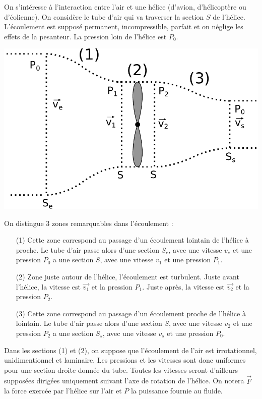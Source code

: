 \documentclass{report}
\begin{document}
On s'intéresse à l'interaction entre l'air et une hélice (d'avion, d'hélicoptère ou d'éolienne). On considère le tube d'air qui va traverser la section $S$ de l'hélice. L'écoulement est supposé permanent, incompressible, parfait et on néglige les effets de la pesanteur. La pression loin de l'hélice est $P_0$. 

\begin{center}
	\includegraphics[scale=0.5]{meca_flu6.pdf}
\end{center}

On distingue 3 zones remarquables dans l'écoulement :
\begin{itemize}
	\item[(1) ] Cette zone correspond au passage d'un écoulement lointain de l'hélice à proche. Le tube d'air passe alors d'une section $S_e$, avec une vitesse $v_e$ et une pression $P_0$ a une section $S$, avec une vitesse $v_1$ et une pression $P_1$.
	\item[(2) ] Zone juste autour de l'hélice, l'écoulement est turbulent. Juste avant l'hélice, la vitesse est $\vec{v_1}$ et la pression $P_1$. Juste après, la vitesse est $\vec{v_2}$ et la pression $P_2$.
	\item[(3) ] Cette zone correspond au passage d'un écoulement proche de l'hélice à lointain. Le tube d'air passe alors d'une section $S$, avec une vitesse $v_2$ et une pression $P_2$ a une section $S_s$, avec une vitesse $v_s$ et une pression $P_0$.
\end{itemize}
Dans les sections (1) et (2), on suppose que l'écoulement de l'air est irrotationnel, unidimentionnel et laminaire. Les pressions et les vitesses sont donc uniformes pour une section droite donnée du tube. Toutes les vitesses seront d'ailleurs supposées dirigées uniquement suivant l'axe de rotation de l'hélice. 
On notera $\vec{F}$ la force exercée par l'hélice sur l'air et $P$ la puissance fournie au fluide.
\end{document}
